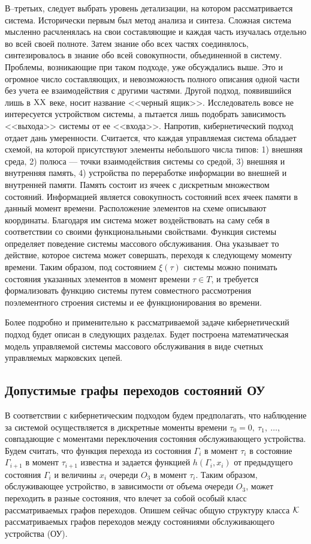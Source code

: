 \documentclass[a4paper,12pt,russian]{extarticle}
\newcommand{\G}{\Gamma}
\begin{document}
В--третьих, следует выбрать уровень детализации, на котором рассматривается система. Исторически первым был метод анализа и синтеза. Сложная система мысленно расчленялась на свои составляющие и каждая часть изучалась отдельно во всей своей полноте. Затем знание обо всех частях соединялось, синтезировалось в знание обо всей совокупности, объединенной в систему. Проблемы, возникающие при таком подходе, уже обсуждались выше. Это и огромное число составляющих, и невозможность полного описания одной части без учета ее взаимодействия с другими частями. Другой подход, появившийся лишь в $\mathrm{\Rmnum{20}}$ веке, носит название <<черный ящик>>. Исследователь вовсе не интересуется устройством системы, а пытается лишь подобрать зависимость <<выхода>> системы от ее <<входа>>. Напротив, кибернетический подход отдает дань умеренности. Считается, что каждая управляемая система обладает схемой, на которой присутствуют элементы небольшого числа типов: 1) внешняя среда, 2) полюса --- точки взаимодействия системы со средой, 3) внешняя и внутренняя память, 4) устройства по переработке информации во внешней и внутренней памяти. Память состоит из ячеек с дискретным множеством состояний. Информацией является совокупность состояний всех ячеек памяти в данный момент времени. Расположение элементов на схеме описывают координаты. Благодаря им система может воздействовать на саму себя в соответствии со своими функциональными свойствами. Функция системы определяет поведение системы массового обслуживания. Она указывает то действие, которое система может совершать, переходя к следующему моменту времени. Таким образом, под состоянием $\xi(\tau)$ системы можно понимать состояния указанных элементов в момент времени $\tau \in T$, и требуется формализовать функцию системы путем совместного рассмотрения поэлементного строения системы и ее функционирования во времени. 

Более подробно и применительно к рассматриваемой задаче кибернетический подход будет описан в следующих разделах. Будет построена математическая модель управляемой системы массового обслуживания в виде счетных управляемых марковских цепей.

\subsection{Допустимые графы переходов состояний ОУ}
В соответствии с кибернетическим подходом будем предполагать, что наблюдение за системой осуществляется в дискретные моменты времени $\tau_0 = 0,~ \tau_1,~ \ldots$,~  совпадающие с моментами переключения состояния обслуживающего устройства. 
Будем считать, что функция перехода из состояния $\G_i$ в момент $\tau_i$ в состояние $\G_{i+1}$ в момент $\tau_{i+1}$ известна и задается функцией $h(\G_i,x_i)$ от предыдущего состояния $\G_i$ и величины $x_i$ очереди $O_3$ в момент $\tau_i$. Таким образом, обслуживающее устройство, в зависимости от объема очереди $O_3$, может переходить в разные состояния, что влечет за собой особый класс рассматриваемых графов переходов. Опишем сейчас общую структуру класса ${\cal K}$ рассматриваемых графов переходов между состояниями обслуживающего устройства (ОУ).
\end{document}
